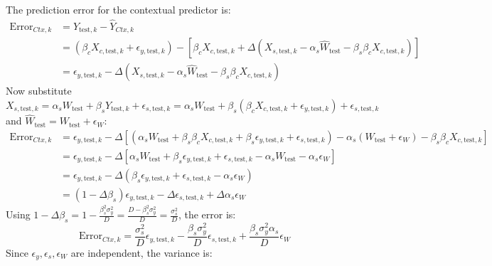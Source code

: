 \documentclass[11pt]{article}
\begin{document}
The prediction error for the contextual predictor is:
\begin{align*}
    \text{Error}_{Ctx,k} &= Y_{\text{test},k} - \hat{Y}_{Ctx,k} \\
    &= (\beta_c X_{c,\text{test},k} + \epsilon_{y,\text{test},k}) - \left[ \beta_c X_{c,\text{test},k} + \Delta (X_{s,\text{test},k} - \alpha_s \hat{W}_{\text{test}} - \beta_s \beta_c X_{c,\text{test},k}) \right] \\
    &= \epsilon_{y,\text{test},k} - \Delta (X_{s,\text{test},k} - \alpha_s \hat{W}_{\text{test}} - \beta_s \beta_c X_{c,\text{test},k})
\end{align*}
Now substitute $X_{s,\text{test},k} = \alpha_s W_{\text{test}} + \beta_s Y_{\text{test},k} + \epsilon_{s,\text{test},k} = \alpha_s W_{\text{test}} + \beta_s (\beta_c X_{c,\text{test},k} + \epsilon_{y,\text{test},k}) + \epsilon_{s,\text{test},k}$ and $\hat{W}_{\text{test}} = W_{\text{test}} + \epsilon_W$:
\begin{align*}
    \text{Error}_{Ctx,k} &= \epsilon_{y,\text{test},k} - \Delta \left[ (\alpha_s W_{\text{test}} + \beta_s \beta_c X_{c,\text{test},k} + \beta_s \epsilon_{y,\text{test},k} + \epsilon_{s,\text{test},k}) - \alpha_s (W_{\text{test}} + \epsilon_W) - \beta_s \beta_c X_{c,\text{test},k} \right] \\
    &= \epsilon_{y,\text{test},k} - \Delta \left[ \alpha_s W_{\text{test}} + \beta_s \epsilon_{y,\text{test},k} + \epsilon_{s,\text{test},k} - \alpha_s W_{\text{test}} - \alpha_s \epsilon_W \right] \\
    &= \epsilon_{y,\text{test},k} - \Delta (\beta_s \epsilon_{y,\text{test},k} + \epsilon_{s,\text{test},k} - \alpha_s \epsilon_W) \\
    &= (1 - \Delta \beta_s) \epsilon_{y,\text{test},k} - \Delta \epsilon_{s,\text{test},k} + \Delta \alpha_s \epsilon_W
\end{align*}
Using $1 - \Delta \beta_s = 1 - \frac{\beta_s^2 \sigma_y^2}{D} = \frac{D - \beta_s^2 \sigma_y^2}{D} = \frac{\sigma_s^2}{D}$, the error is:
\[ \text{Error}_{Ctx,k} = \frac{\sigma_s^2}{D} \epsilon_{y,\text{test},k} - \frac{\beta_s \sigma_y^2}{D} \epsilon_{s,\text{test},k} + \frac{\beta_s \sigma_y^2 \alpha_s}{D} \epsilon_W \]
Since $\epsilon_y, \epsilon_s, \epsilon_W$ are independent, the variance is:
\end{document}
